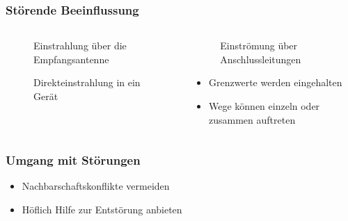 \begin{frame}
\frametitle{Störende Beeinflussung}
\begin{columns}
    \begin{column}{0.48\textwidth}
    
\begin{figure}
    \caption{\scriptsize Einstrahlung über die Empfangsantenne}
    \label{stoerungen_vermeiden_einstrahlung}
\end{figure}


\begin{figure}
    \caption{\scriptsize Direkteinstrahlung in ein Gerät}
    \label{stoerungen_vermeiden_direkteinstrahlung}
\end{figure}


    \end{column}
   \begin{column}{0.48\textwidth}
       
\begin{figure}
    \caption{\scriptsize Einströmung über Anschlussleitungen}
    \label{stoerungen_vermeiden_einstroemung}
\end{figure}

\begin{itemize}
  \item Grenzwerte werden eingehalten
  \item Wege können einzeln oder zusammen auftreten
  \end{itemize}

   \end{column}
\end{columns}

\end{frame}

\begin{frame}
\frametitle{Umgang mit Störungen}
\begin{itemize}
  \item Nachbarschaftskonflikte vermeiden
  \item Höflich Hilfe zur Entstörung anbieten
  \end{itemize}
\end{frame}

